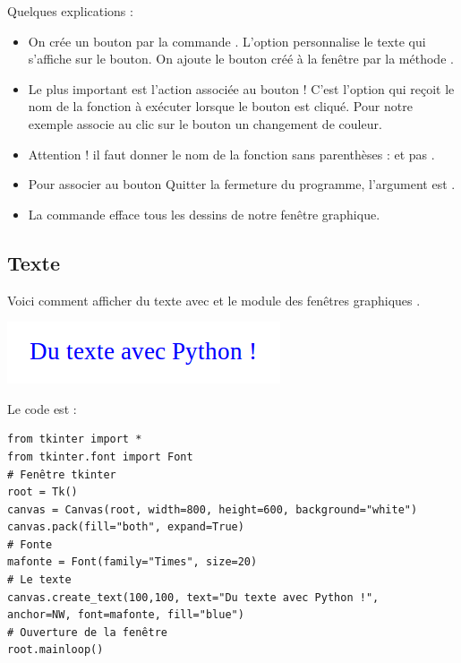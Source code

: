 \documentclass[11pt,class=report,crop=false]{standalone}
\begin{document}
Quelques explications :
\begin{itemize}
  \item On crée un bouton par la commande . L'option  personnalise le texte qui s'affiche sur le bouton. On ajoute le bouton créé à la fenêtre par la méthode .
  \item Le plus important est l'action associée au bouton ! C'est l'option  qui reçoit le nom de la fonction à exécuter lorsque le bouton est cliqué. Pour notre exemple  associe au clic sur le bouton un changement de couleur.
  
  \item Attention ! il faut donner le nom de la fonction sans parenthèses :  et pas .
  
  \item Pour associer au bouton \og{}Quitter\fg{} la fermeture du programme, l'argument est .
  
  \item La commande  efface tous les dessins de notre fenêtre graphique.
  
\end{itemize}

\subsection{Texte}

Voici comment afficher du texte avec \Python{} et le module des fenêtres graphiques .

\begin{center}
\includegraphics[scale=\myscale,scale=0.6]{../markdown/ecran-markdown-7}
\end{center}
Le code est :
\begin{lstlisting}
from tkinter import *
from tkinter.font import Font
# Fenêtre tkinter
root = Tk() 
canvas = Canvas(root, width=800, height=600, background="white")
canvas.pack(fill="both", expand=True)
# Fonte
mafonte = Font(family="Times", size=20)
# Le texte
canvas.create_text(100,100, text="Du texte avec Python !", 
anchor=NW, font=mafonte, fill="blue")
# Ouverture de la fenêtre
root.mainloop()
\end{lstlisting}
\end{document}
